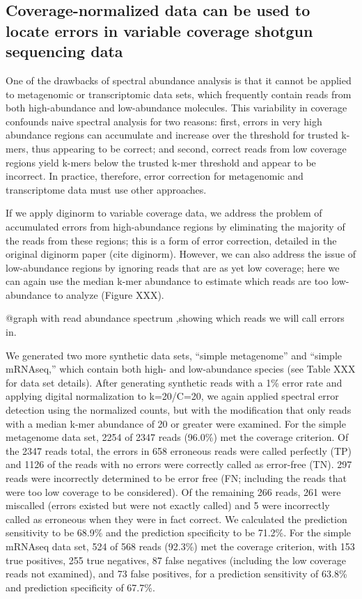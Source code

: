 \subsection{Coverage-normalized data can be used to locate errors in variable
coverage shotgun sequencing data}

One of the drawbacks of spectral abundance analysis is that it cannot
be applied to metagenomic or transcriptomic data sets, which
frequently contain reads from both high-abundance and low-abundance
molecules.  This variability in coverage confounds naive spectral
analysis for two reasons: first, errors in very high abundance regions
can accumulate and increase over the threshold for trusted k-mers,
thus appearing to be correct; and second, correct reads from low
coverage regions yield k-mers below the trusted k-mer threshold and
appear to be incorrect.  In practice, therefore, error correction for
metagenomic and transcriptome data must use other approaches.

If we apply diginorm to variable coverage data, we address the problem
of accumulated errors from high-abundance regions by eliminating the
majority of the reads from these regions; this is a form of error
correction, detailed in the original diginorm paper (cite diginorm).
However, we can also address the issue of low-abundance regions by
ignoring reads that are as yet low coverage; here we can again use
the median k-mer abundance to estimate which reads are too
low-abundance to analyze (Figure XXX).

@graph with read abundance spectrum ,showing which reads we will
call errors in.


We generated two more synthetic data sets, ``simple metagenome'' and
``simple mRNAseq,'' which contain both high- and low-abundance species
(see Table XXX for data set details).  After generating synthetic
reads with a 1\% error rate and applying digital normalization to
k=20/C=20, we again applied spectral error detection
using the normalized counts, but with the modification that only reads
with a median k-mer abundance of 20 or greater were examined.  For the
simple metagenome data set, 2254 of 2347 reads (96.0\%) met the
coverage criterion.  Of the 2347 reads total, the errors in 658
erroneous reads were called perfectly (TP) and 1126 of the reads with
no errors were correctly called as error-free (TN).  297 reads were
incorrectly determined to be error free (FN; including the reads that
were too low coverage to be considered).  Of the remaining 266 reads,
261 were miscalled (errors existed but were not exactly called) and 5
were incorrectly called as erroneous when they were in fact correct.
We calculated the prediction sensitivity to be 68.9\% and the
prediction specificity to be 71.2\%.  For the simple mRNAseq data set,
524 of 568 reads (92.3\%) met the coverage criterion, with 153 true
positives, 255 true negatives, 87 false negatives (including the low
coverage reads not examined), and 73 false positives, for a prediction
sensitivity of 63.8\% and prediction specificity of 67.7\%.

